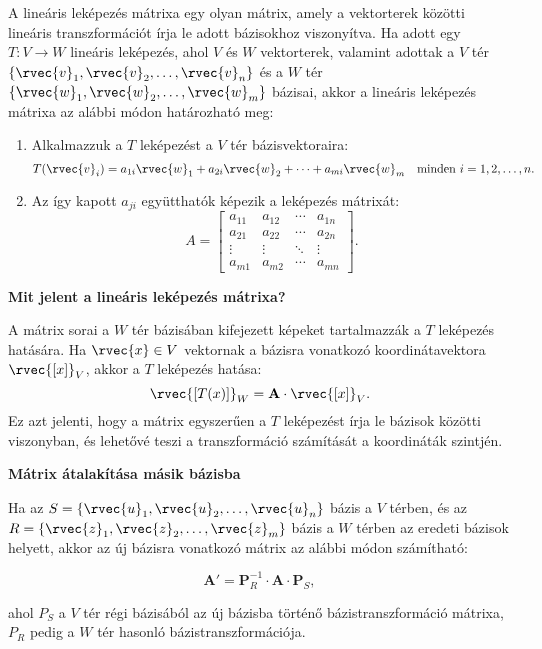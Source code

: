 \documentclass[a4paper, 12pt]{scrartcl}
\begin{document}
\begin{definition}
  A lineáris leképezés mátrixa egy olyan mátrix, amely a vektorterek közötti lineáris transzformációt írja le adott bázisokhoz viszonyítva. Ha adott egy $T: V \to W$ lineáris leképezés, ahol $V$ és $W$ vektorterek, valamint adottak a $V$ tér $\{\rvec{v}_1, \rvec{v}_2, \dots, \rvec{v}_n\}$ és a $W$ tér $\{\rvec{w}_1, \rvec{w}_2, \dots, \rvec{w}_m\}$ bázisai, akkor a lineáris leképezés mátrixa az alábbi módon határozható meg:
  \begin{enumerate}
    \item Alkalmazzuk a $T$ leképezést a $V$ tér bázisvektoraira:
          \[
            T(\rvec{v}_i) = a_{1i} \rvec{w}_1 + a_{2i} \rvec{w}_2 + \dots + a_{mi} \rvec{w}_m \quad \text{minden } i = 1, 2, \dots, n.
          \]

    \item Az így kapott $a_{ji}$ együtthatók képezik a leképezés mátrixát:
          \[
            A = \begin{bmatrix}
              a_{11} & a_{12} & \cdots & a_{1n} \\
              a_{21} & a_{22} & \cdots & a_{2n} \\
              \vdots & \vdots & \ddots & \vdots \\
              a_{m1} & a_{m2} & \cdots & a_{mn}
            \end{bmatrix}.
          \]
  \end{enumerate}

  \textbf{Mit jelent a lineáris leképezés mátrixa?}

  A mátrix sorai a $W$ tér bázisában kifejezett képeket tartalmazzák a $T$ leképezés hatására. Ha $\rvec{x} \in V$ vektornak a bázisra vonatkozó koordinátavektora $\rvec{[x]}_V$, akkor a $T$ leképezés hatása:
  \[
    \rvec{[T(x)]}_W = \textbf{A} \cdot \rvec{[x]}_V.
  \]
  Ez azt jelenti, hogy a mátrix egyszerűen a $T$ leképezést írja le bázisok közötti viszonyban, és lehetővé teszi a transzformáció számítását a koordináták szintjén.

  \textbf{Mátrix átalakítása másik bázisba}

  Ha az $S = \{\rvec{u}_1, \rvec{u}_2, \dots, \rvec{u}_n\}$ bázis a $V$ térben, és az $R = \{\rvec{z}_1, \rvec{z}_2, \dots, \rvec{z}_m\}$ bázis a $W$ térben az eredeti bázisok helyett, akkor az új bázisra vonatkozó mátrix az alábbi módon számítható:

  \[
    \textbf{A}' = \textbf{P}_R^{-1} \cdot \textbf{A} \cdot \textbf{P}_S,
  \]

  ahol $P_S$ a $V$ tér régi bázisából az új bázisba történő bázistranszformáció mátrixa, $P_R$ pedig a $W$ tér hasonló bázistranszformációja.
\end{definition}
\end{document}

